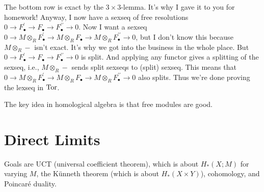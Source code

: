 The bottom row is exact by the $3\times 3$-lemma. It's why I gave it to you for homework! Anyway, I now have a sexseq of free resolutions $0\to F^\prime_\bullet\to F_\bullet\to F^{\prime\prime}_\bullet\to 0$. Now I want a sexseq $0\to M\otimes_R F^\prime_\bullet\to M\otimes_R F_\bullet\to M\otimes_R F^{\prime\prime}_\bullet\to 0$, but I don't know this because $M\otimes_R -$ isn't exact. It's why we got into the business in the whole place. But $0\to F^\prime_\bullet\to F_\bullet\to F^{\prime\prime}_\bullet\to 0$ is split. And applying any functor gives a splitting of the sexseq, i.e., $M\otimes_R -$ sends split sexseqs to (split) sexseq. This means that $0\to M\otimes_R F^\prime_\bullet\to M\otimes_R F_\bullet\to M\otimes_R F^{\prime\prime}_\bullet\to 0$ also splits. Thus we're done proving the lexseq in $\operatorname{Tor}$.

The key idea in homological algebra is that free modules are good.
\section{Direct Limits}
Goals are UCT (universal coefficient theorem), which is about $ H_\ast(X;M)$ for varying $M$, the K\"{u}nneth theorem (which is about $ H_\ast(X\times Y)$), cohomology, and Poincar\'{e} duality.

